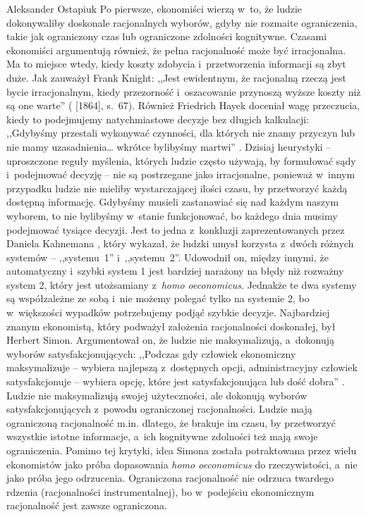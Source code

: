 \begin{artplenv}{Aleksander Ostapiuk}
Po pierwsze, ekonomiści wierzą w~to, że ludzie dokonywaliby doskonale racjonalnych wyborów, gdyby nie rozmaite
ograniczenia, takie jak ograniczony czas lub ograniczone zdolności kognitywne. Czasami ekonomiści argumentują również,
że pełna racjonalność może być irracjonalna. Ma to miejsce wtedy, kiedy koszty zdobycia i~przetworzenia informacji są
zbyt duże. Jak zauważył Frank \mbox{Knight}: ,,Jest ewidentnym, że racjonalną rzeczą jest bycie irracjonalnym, kiedy
przezorność i~oszacowanie przynoszą wyższe koszty niż są one warte''
(\cite{knight_risk_1921} [1864], s.~67).
Również Friedrich Hayek doceniał wagę przeczucia, kiedy to podejmujemy natychmiastowe decyzje bez długich
kalkulacji: ,,Gdybyśmy przestali wykonywać czynności, dla których nie znamy przyczyn lub nie mamy uzasadnienia… wkrótce
bylibyśmy martwi''
\parencite[s.~68]{hayek_fatal_1988}.
Dzisiaj heurystyki -- uproszczone reguły myślenia,
których ludzie często używają, by formułować sądy i~podejmować decyzję -- nie są postrzegane jako irracjonalne, ponieważ
w~innym przypadku ludzie nie mieliby wystarczającej ilości czasu, by przetworzyć każdą dostępną informację. Gdybyśmy musieli zastanawiać
się nad każdym naszym wyborem, to nie bylibyśmy w~stanie funkcjonować, bo każdego dnia musimy podejmować tysiące
decyzji. Jest to jedna z~konkluzji zaprezentowanych przez Daniela Kahnemana
\parencite*{kahneman_pulapki_2012}, który wykazał, że ludzki umysł korzysta z~dwóch różnych systemów -- ,,systemu~1'' i~,,systemu~2''.
Udowodnił on,
między innymi, że automatyczny i~szybki system 1 jest bardziej narażony na błędy niż rozważny system 2, który jest
utożsamiany z~\textit{homo oeconomicus}. Jednakże te dwa systemy są współzależne ze sobą i~nie możemy
polegać tylko na systemie 2, bo
w~większości wypadków potrzebujemy podjąć szybkie decyzje. Najbardziej znanym ekonomistą, który podważył założenia
racjonalności doskonałej, był Herbert Simon. Argumentował on, że ludzie nie maksymalizują, a~dokonują wyborów
satysfakcjonujących: ,,Podczas gdy człowiek ekonomiczny maksymalizuje -- wybiera najlepszą z~dostępnych opcji,
administracyjny człowiek satysfakcjonuje -- wybiera opcję, które jest satysfakcjonująca lub dość dobra''
\parencite[s.~XXIX]{simon_administrative_1947}.
Ludzie nie maksymalizują swojej użyteczności, ale dokonują wyborów
satysfakcjonujących z~powodu ograniczonej racjonalności. Ludzie mają ograniczoną racjonalność m.in. dlatego, że
brakuje im czasu, by przetworzyć wszystkie istotne informacje, a~ich kognitywne zdolności też mają swoje ograniczenia.
Pomimo tej krytyki, idea Simona została potraktowana przez wielu ekonomistów jako próba dopasowania \textit{homo
oeconomicus} do rzeczywistości, a~nie jako próba jego odrzucenia. Ograniczona racjonalność nie odrzuca twardego rdzenia
(racjonalności instrumentalnej), bo w~podejściu ekonomicznym racjonalność jest zawsze ograniczona.


\end{artplenv}
